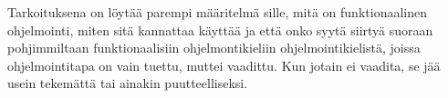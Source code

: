 Tarkoituksena on löytää parempi määritelmä sille, mitä on funktionaalinen ohjelmointi, miten sitä kannattaa käyttää ja että onko syytä siirtyä suoraan pohjimmiltaan funktionaalisiin ohjelmontikieliin ohjelmointikielistä, joissa ohjelmointitapa on vain tuettu, muttei vaadittu. Kun jotain ei vaadita, se jää usein tekemättä tai ainakin puutteelliseksi.
